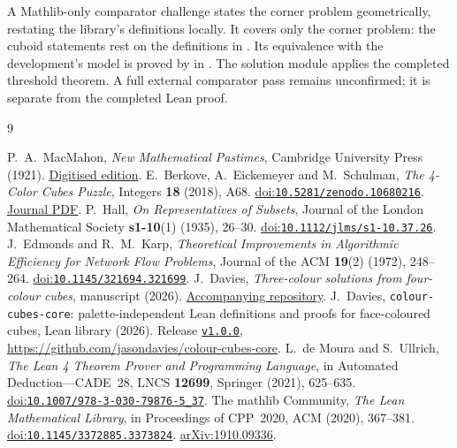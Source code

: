 \documentclass[11pt]{article}
\theoremstyle{remark}
\begin{document}
A Mathlib-only comparator challenge states the corner problem geometrically,
restating the library's definitions locally. It covers only the corner
problem: the cuboid statements rest on the definitions in
. Its equivalence with the development's
model is proved by
 in
. The solution module applies the
completed threshold theorem. A full external comparator pass remains
unconfirmed; it is separate from the completed Lean proof.

\begin{thebibliography}{9}
\raggedright
{} P.~A.~MacMahon,
\emph{New Mathematical Pastimes}, Cambridge University Press (1921).
\href{https://archive.org/details/newmathematicalp00macmuoft}{Digitised edition}.
 E.~Berkove, A.~Eickemeyer and M.~Schulman,
\emph{The 4-Color Cubes Puzzle}, Integers \textbf{18} (2018), A68.
\href{https://doi.org/10.5281/zenodo.10680216}{doi:\nolinkurl{10.5281/zenodo.10680216}}.
\href{https://math.colgate.edu/~integers/s68/s68.pdf}{Journal PDF}.
 P.~Hall, \emph{On Representatives of Subsets},
Journal of the London Mathematical Society \textbf{s1-10}(1) (1935), 26--30.
\href{https://doi.org/10.1112/jlms/s1-10.37.26}{doi:\nolinkurl{10.1112/jlms/s1-10.37.26}}.
 J.~Edmonds and R.~M.~Karp,
\emph{Theoretical Improvements in Algorithmic Efficiency for Network Flow Problems},
Journal of the ACM \textbf{19}(2) (1972), 248--264.
\href{https://doi.org/10.1145/321694.321699}{doi:\nolinkurl{10.1145/321694.321699}}.
 J.~Davies,
\emph{Three-colour solutions from four-colour cubes}, manuscript (2026).
\href{https://github.com/jasondavies/four-to-three-colour-cubes}{Accompanying repository}.
 J.~Davies,
\texttt{colour-\allowbreak cubes-\allowbreak core}: palette-independent Lean definitions and proofs
for face-coloured cubes, Lean library (2026).
Release \href{https://github.com/jasondavies/colour-cubes-core/tree/v1.0.0}{\texttt{v1.0.0}},
\url{https://github.com/jasondavies/colour-cubes-core}.
 L.~de Moura and S.~Ullrich,
\emph{The Lean 4 Theorem Prover and Programming Language},
in Automated Deduction---CADE~28, LNCS \textbf{12699}, Springer (2021), 625--635.
\href{https://doi.org/10.1007/978-3-030-79876-5_37}{doi:\nolinkurl{10.1007/978-3-030-79876-5_37}}.
 The mathlib Community, \emph{The Lean Mathematical Library},
in Proceedings of CPP~2020, ACM (2020), 367--381.
\href{https://doi.org/10.1145/3372885.3373824}{doi:\nolinkurl{10.1145/3372885.3373824}}.
\href{https://arxiv.org/abs/1910.09336}{arXiv:1910.09336}.
\end{thebibliography}
\end{document}
